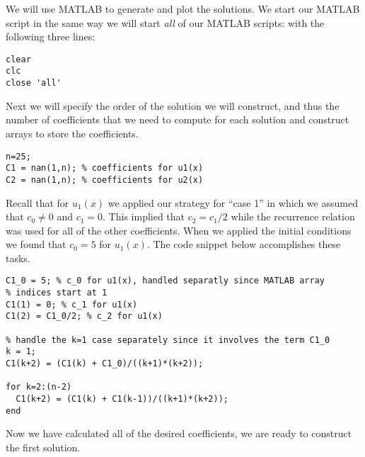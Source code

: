 We will use MATLAB to generate and plot the solutions.  We start our MATLAB script in the same way we will start \emph{all} of our MATLAB scripts: with the following three lines:
\begin{lstlisting}[name=lec9_ex1]
clear
clc
close 'all'
\end{lstlisting}
Next we will specify the order of the solution we will construct, and thus the number of coefficients that we need to compute for each solution and construct arrays to store the coefficients.
\begin{lstlisting}[name=lec9_ex1]
n=25;
C1 = nan(1,n); % coefficients for u1(x)
C2 = nan(1,n); % coefficients for u2(x)
\end{lstlisting}
Recall that for $u_1(x)$ we applied our strategy for ``case 1'' in which we assumed that $c_0 \ne 0$ and $c_1 = 0$.  This implied that $c_2 = c_1/2$ while the recurrence relation was used for all of the other coefficients.  When we applied the initial conditions we found that $c_0=5$ for $u_1(x)$.  The code snippet below accomplishes these tasks.
\begin{lstlisting}[name=lec9_ex1]
C1_0 = 5; % c_0 for u1(x), handled separatly since MATLAB array 
% indices start at 1
C1(1) = 0; % c_1 for u1(x)
C1(2) = C1_0/2; % c_2 for u1(x)

% handle the k=1 case separately since it involves the term C1_0
k = 1;
C1(k+2) = (C1(k) + C1_0)/((k+1)*(k+2));

for k=2:(n-2)
  C1(k+2) = (C1(k) + C1(k-1))/((k+1)*(k+2));
end
\end{lstlisting} 
Now we have calculated all of the desired coefficients, we are ready to construct the first solution.
